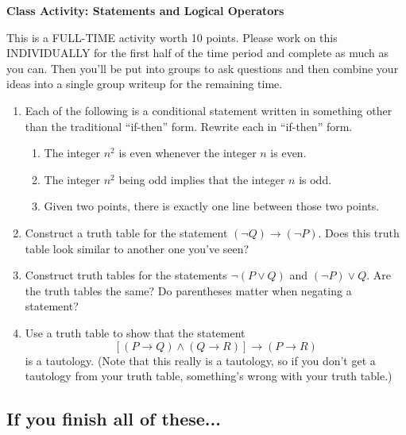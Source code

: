 \documentclass[11pt]{article}
\begin{document}
	
	\thispagestyle{empty}
	\renewcommand{\headrulewidth}{0.0pt}
	\thispagestyle{fancy}
	\lfoot{}
	\cfoot{}
	\rfoot{}	
	
	\vspace*{0in}

		\begin{center}
			\begin{large}
			\textbf{Class Activity: Statements and Logical Operators} \\
			\end{large}
		\end{center}
		
This is a FULL-TIME activity worth 10 points. Please work on this INDIVIDUALLY for the first half of the time period and complete as much as you can. Then you'll be put into groups to ask questions and then combine your ideas into a single group writeup for the remaining time. 

\begin{enumerate}
	\item Each of the following is a conditional statement written in something other than the traditional ``if-then'' form. Rewrite each in ``if-then'' form. 
	\begin{enumerate}
		\item The integer $n^2$ is even whenever the integer $n$ is even. 
		\item The integer $n^2$ being odd implies that the integer $n$ is odd. 
		\item Given two points, there is exactly one line between those two points. 
	\end{enumerate}
	\item Construct a truth table for the statement $(\neg Q) \rightarrow (\neg P)$. Does this truth table look similar to another one you've seen? 
	\item Construct truth tables for the statements $\neg(P \vee Q)$ and $(\neg P) \vee Q$. Are the truth tables the same? Do parentheses matter when negating a statement? 
	\item Use a truth table to show that the statement
	\[ [(P \rightarrow Q) \wedge (Q \rightarrow R)] \rightarrow (P \rightarrow R) \]
	is a tautology. (Note that this really is a tautology, so if you don't get a tautology from your truth table, something's wrong with your truth table.) 
\end{enumerate}	
	
\subsection*{If you finish all of these...}
\end{document}
